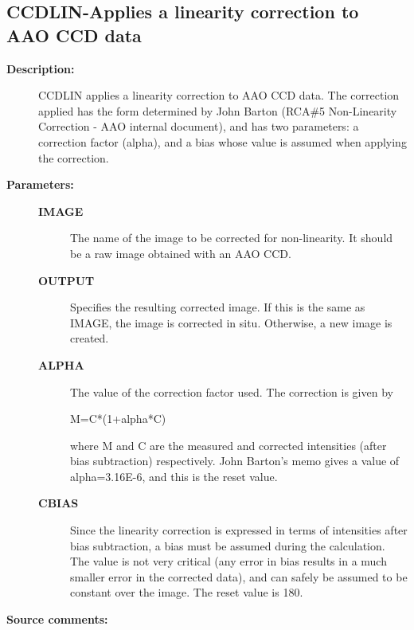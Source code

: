 \subsection{CCDLIN-\label{CCDLIN}Applies a linearity correction to AAO CCD data}
\begin{description}

\item [\textbf{Description:}]
 CCDLIN applies a linearity correction to AAO CCD data.  The
 correction applied has the form determined by John Barton (RCA\#5
 Non-Linearity Correction - AAO internal document), and has two
 parameters: a correction factor (alpha), and a bias whose value
 is assumed when applying the correction.

\item [\textbf{Parameters:}]
\begin{description}
\item [\textbf{IMAGE}]
 The name of the image to be corrected for non-linearity.
 It should be a raw image obtained with an AAO CCD.
\item [\textbf{OUTPUT}]
 Specifies the resulting corrected image.  If this is the
 same as IMAGE, the image is corrected in situ.
 Otherwise, a new image is created.
\item [\textbf{ALPHA}]
 The value of the correction factor used.  The correction
 is given by

    M=C*(1+alpha*C)

 where M and C are the measured and corrected intensities
 (after bias subtraction) respectively.  John Barton's memo
 gives a value of alpha=3.16E-6, and this is the reset value.
\item [\textbf{CBIAS}]
 Since the linearity correction is expressed in terms of
 intensities after bias subtraction, a bias must be
 assumed during the calculation.  The value is not very
 critical (any error in bias results in a much smaller
 error in the corrected data), and can safely be assumed
 to be constant over the image.  The reset value is 180.
\end{description}

\item [\textbf{Source comments:}]
\end{description}
